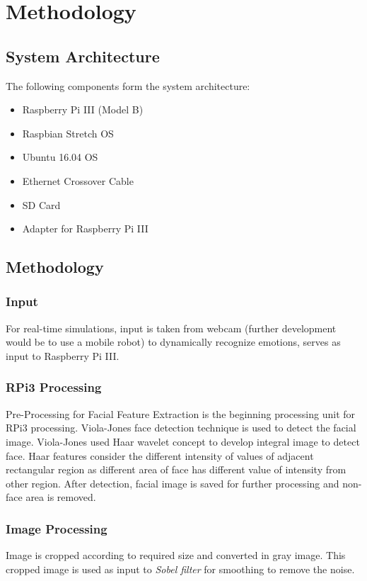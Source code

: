 \chapter{Methodology}

\section{System Architecture}
The following components form the system architecture:
\begin{itemize}
\item Raspberry Pi III (Model B)
\item Raspbian Stretch OS
\item Ubuntu 16.04 OS
\item Ethernet Crossover Cable
\item SD Card
\item Adapter for Raspberry Pi III
\end{itemize}
\section{Methodology}

\subsection{Input}
For real-time simulations, input is taken from webcam (further development would be to use a mobile robot) to dynamically recognize emotions, serves as input to Raspberry Pi III.

\subsection{RPi3 Processing}
Pre-Processing for Facial Feature Extraction is the beginning processing unit for RPi3 processing. Viola-Jones \cite{viola2004} face detection technique is used to detect the facial image. Viola-Jones used Haar wavelet concept to develop integral image to detect face. Haar features consider the different intensity of values of adjacent rectangular region as different area of face has different value of intensity from other region. After detection, facial image is saved for further processing and non-face area is removed. 

\subsection{Image Processing}
Image is cropped according to required size and converted in gray image. This cropped image is used as input to \textit{Sobel filter} for smoothing to remove the noise.

